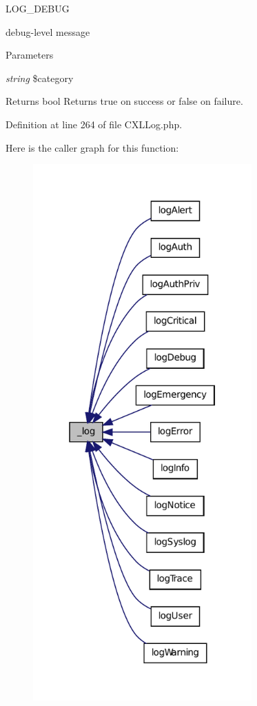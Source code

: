 LOG\_\-DEBUG 

debug-\/level message  


\begin{DoxyParams}{Parameters}
\item[{\em string}]\$category \end{DoxyParams}
\begin{DoxyReturn}{Returns}
bool Returns true on success or false on failure. 
\end{DoxyReturn}


Definition at line 264 of file CXLLog.php.








Here is the caller graph for this function:\nopagebreak
\begin{figure}[H]
\begin{center}
\leavevmode
\includegraphics[width=238pt]{classCXLLog_a04d7843ce3340c0a92f05fc31116b954_icgraph}
\end{center}
\end{figure}



